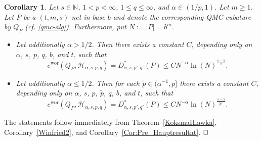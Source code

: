 \documentclass[12pt]{article}
\DeclareMathOperator{\wor}{wor}
\newtheorem{corollary}{Corollary}
\newenvironment{proof}{\begin{trivlist}
    \item[\hskip\labelsep{\it Proof.}]}{$\hfill\Box$\end{trivlist}}
\newcommand{\HH}{\mathcal{H}}
\newcommand{\N}{\mathbb{N}}
\newcommand{\mig}[1]{\textcolor{blue}{#1}}
\begin{document}
\begin{corollary}\label{Hauptresultat}
Let $s\in\N$, $1 < p < \infty$, $1\le q \le \infty$, and  $\alpha \in (1/p, 1)$. 
Let $m\ge 1$. Let $P$ be a $(t,m,s)$-net in base $b$ and denote the corresponding QMC-cubature  by $Q_P$ (cf.  \eqref{qmc-alg}). 
Furthermore, put $N:= |P| = b^m$.
\begin{itemize}
\item[{\rm (}i{\rm )}] Let additionally $\alpha > 1/2$. Then there exists a constant $C$, depending only on $\alpha$,
$s$, $p$, $q$, $b$, and $t$, such that
\begin{equation}\label{frac_disc_estimate}
e^{\wor}(Q_P, \HH_{\alpha,s,p, q}) = D^*_{\alpha,s,p',q'}(P) 
\le C N^{-\alpha} \ln(N)^{\frac{s-1}{2}}.
\end{equation}
\item[{\rm (}ii{\rm )}] Let additionally $\alpha \le 1/2$. Then for each $\widetilde{p} \in (\alpha^{-1}, p]$ there exists a constant $C$, depending only on $\alpha$,
$s$, $p$, $\widetilde{p}$, $q$, $b$, and $t$, such that
\begin{equation}\label{frac_disc_estimate_2}
e^{\wor}(Q_P, \HH_{\alpha,s,p, q}) = D^*_{\alpha,s, p',q'}(P) 
\le C N^{-\alpha} \ln(N)^{\frac{s-1}{{\widetilde{p}}'}}.
\end{equation}
\end{itemize}
\end{corollary}

\begin{proof}
The statements follow immediately from Theorem~\ref{KoksmaHlawka},
Corollary~\ref{Winfried2},
and Corollary~\ref{Cor:Pre_Hauptresultat}.
\end{proof}
\end{document}
